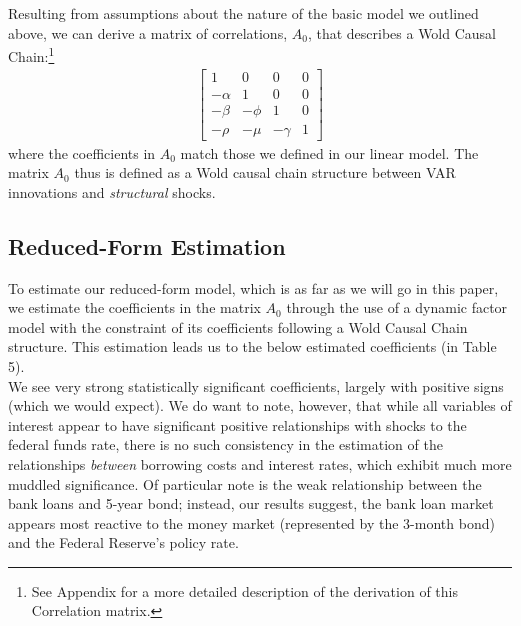 \documentclass[12pt,final]{article}
\begin{document}
Resulting from assumptions about the nature of the basic model we outlined above, we can derive a matrix of correlations, $A_0$, that describes a Wold Causal Chain:\footnote{See Appendix for a more detailed description of the derivation of this Correlation matrix.}
\begin{gather}
	\begin{bmatrix}1&0&0&0\\-\alpha & 1 & 0 & 0 \\ -\beta & -\phi & 1 & 0 \\ -\rho & -\mu & -\gamma & 1 \end{bmatrix}
\end{gather}
where the coefficients in $A_0$ match those we defined in our linear model. The matrix $A_0$ thus is defined as a Wold causal chain structure between VAR innovations and \textit{structural} shocks.

\subsection{Reduced-Form Estimation}
To estimate our reduced-form model, which is as far as we will go in this paper, we estimate the coefficients in the matrix $A_0$ through the use of a dynamic factor model with the constraint of its coefficients following a Wold Causal Chain structure. This estimation leads us to the below estimated coefficients (in Table 5).
 \\
We see very strong statistically significant coefficients, largely with positive signs (which we would expect). We do want to note, however, that while all variables of interest appear to have significant positive relationships with shocks to the federal funds rate, there is no such consistency in the estimation of the relationships \textit{between} borrowing costs and interest rates, which exhibit much more muddled significance. Of particular note is the weak relationship between the bank loans and 5-year bond; instead, our results suggest, the bank loan market appears most reactive to the money market (represented by the 3-month bond) and the Federal Reserve's policy rate.
\end{document}
